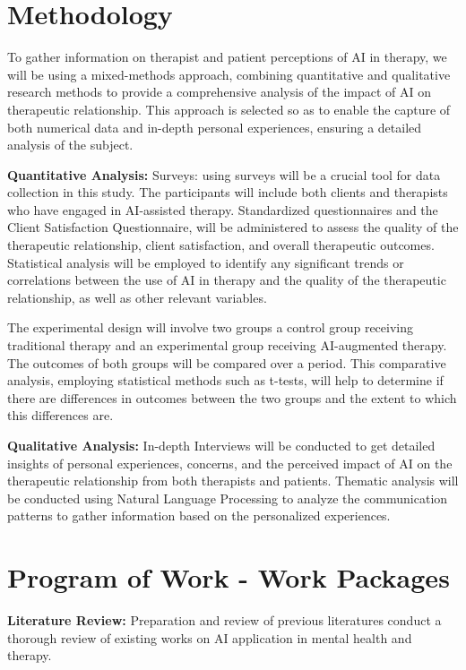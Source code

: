 \documentclass[12pt]{article}
\begin{document}
    \section{Methodology}

    To gather information on therapist and patient perceptions of AI in therapy, we will be using a mixed-methods approach, combining quantitative and qualitative research methods to provide a comprehensive analysis of the impact of AI on therapeutic relationship. This approach is selected so as to enable the capture of both numerical data and in-depth personal experiences, ensuring a detailed analysis of the subject.

    \textbf{Quantitative Analysis:}
    Surveys: using surveys will be a crucial tool for data collection in this study. The participants will include both clients and therapists who have engaged in AI-assisted therapy. Standardized questionnaires and the Client Satisfaction Questionnaire, will be administered to assess the quality of the therapeutic relationship, client satisfaction, and overall therapeutic outcomes. Statistical analysis will be employed to identify any significant trends or correlations between the use of AI in therapy and the quality of the therapeutic relationship, as well as other relevant variables.

    The experimental design will involve two groups a control group receiving traditional therapy and an experimental group receiving AI-augmented therapy. The outcomes of both groups will be compared over a period. This comparative analysis, employing statistical methods such as t-tests, will help to determine if there are  differences in outcomes between the two groups and the extent to which this differences are.

    \textbf{Qualitative Analysis:} In-depth Interviews will be conducted to get detailed insights of personal experiences, concerns, and the perceived impact of AI on the therapeutic relationship from both therapists and patients. Thematic analysis will be conducted using Natural Language Processing to analyze the communication patterns to gather information based on the personalized experiences.



    \section{Program of Work - Work Packages}
    \textbf{Literature Review:} Preparation and review of previous literatures conduct a thorough review of existing works on AI application in mental health and therapy.
\end{document}
